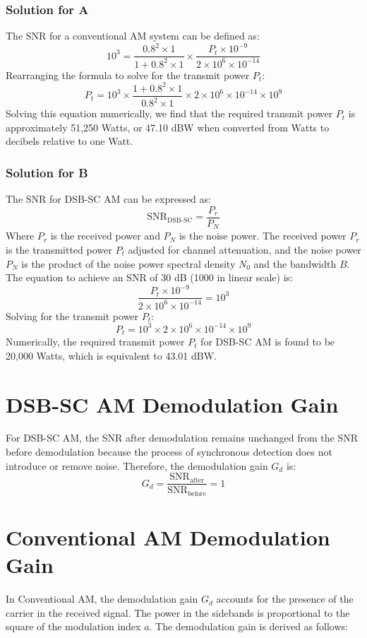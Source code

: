 \documentclass{article}
\begin{document}
\subsubsection*{Solution for A}
The SNR for a conventional AM system can be defined as:
\[ 10^3 = \frac{0.8^2 \times 1}{1 + 0.8^2 \times 1} \times \frac{P_t \times 10^{-9}}{2 \times 10^6 \times 10^{-14}} \]
\newline
Rearranging the formula to solve for the transmit power \( P_t \):
\[ P_t = 10^3 \times \frac{1 + 0.8^2 \times 1}{0.8^2 \times 1} \times 2 \times 10^6 \times 10^{-14} \times 10^9 \]
\newline
Solving this equation numerically, we find that the required transmit power \( P_t \) is approximately 51,250 Watts, or 47.10 dBW when converted from Watts to decibels relative to one Watt.

\subsubsection*{Solution for B}
The SNR for DSB-SC AM can be expressed as:
\[ \text{SNR}_{\text{DSB-SC}} = \frac{P_r}{P_N} \]
\noindent
Where \( P_r \) is the received power and \( P_N \) is the noise power. The received power \( P_r \) is the transmitted power \( P_t \) adjusted for channel attenuation, and the noise power \( P_N \) is the product of the noise power spectral density \( N_0 \) and the bandwidth \( B \). The equation to achieve an SNR of 30 dB (1000 in linear scale) is:
\[ \frac{P_t \times 10^{-9}}{2 \times 10^6 \times 10^{-14}} = 10^3 \]
\noindent
Solving for the transmit power \( P_t \):
\[ P_t = 10^3 \times 2 \times 10^6 \times 10^{-14} \times 10^9 \]
\noindent
Numerically, the required transmit power \( P_t \) for DSB-SC AM is found to be 20,000 Watts, which is equivalent to 43.01 dBW.


\section*{DSB-SC AM Demodulation Gain}
For DSB-SC AM, the SNR after demodulation remains unchanged from the SNR before demodulation because the process of synchronous detection does not introduce or remove noise. Therefore, the demodulation gain \( G_d \) is:
\[ G_d = \frac{\text{SNR}_{\text{after}}}{\text{SNR}_{\text{before}}} = 1 \]

\section*{Conventional AM Demodulation Gain}
In Conventional AM, the demodulation gain \( G_d \) accounts for the presence of the carrier in the received signal. The power in the sidebands is proportional to the square of the modulation index \( a \). The demodulation gain is derived as follows:
\end{document}
